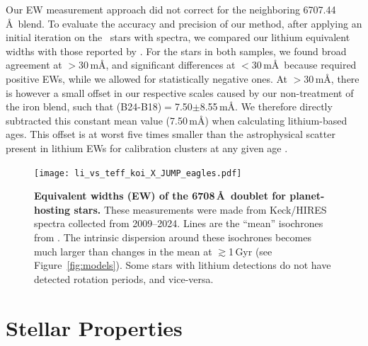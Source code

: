 \documentclass[11pt,twocolumn,tighten,linenumbers]{aastex63}
\begin{document}
Our EW measurement approach did not correct for the neighboring
 6707.44\,\AA\ blend.  To evaluate the accuracy and
precision of our method, after applying an initial iteration on the
\nlithiumstars\ stars with spectra, we compared our lithium equivalent
widths with those reported by \citet{2018ApJ...855..115B}.  For the
stars in both samples, we found broad agreement at $>$30\,m\AA, and
significant differences at $<$30\,m\AA\ because
\citet{2018ApJ...855..115B} required positive EWs, while we allowed
for statistically negative ones.  At $>$30\,m\AA, there is however a
small offset in our respective scales caused by our non-treatment of
the iron blend, such that (B24-B18)$=$7.50$\pm$8.55\,m\AA.  We
therefore directly subtracted this constant mean value (7.50\,m\AA)
when calculating lithium-based ages.  This offset is at worst five
times smaller than the astrophysical scatter present in lithium EWs
for calibration clusters at any given age
\citep[see][]{Jeffries_2023}.


\begin{figure}[!t]
	\begin{center}
		\leavevmode
		\texttt{[image: li\_vs\_teff\_koi\_X\_JUMP\_eagles.pdf]}
	\end{center}
	\vspace{-0.25cm}
	\caption{{\bf Equivalent widths (EW) of the  6708\,\AA\ doublet
    for planet-hosting stars.} These measurements were made from
    Keck/HIRES spectra collected from 2009--2024.  Lines are the ``mean''
    isochrones from \citet{Jeffries_2023}.  The intrinsic dispersion
    around these isochrones becomes much larger than changes in the
    mean at $\gtrsim$1\,Gyr (see Figure~\ref{fig:models}).  Some stars
    with lithium detections do not have detected rotation periods, and
    vice-versa.
		\label{fig:li_vs_teff}
	}
\end{figure}



\section{Stellar Properties}
\label{sec:stellarprops}



\end{document}
